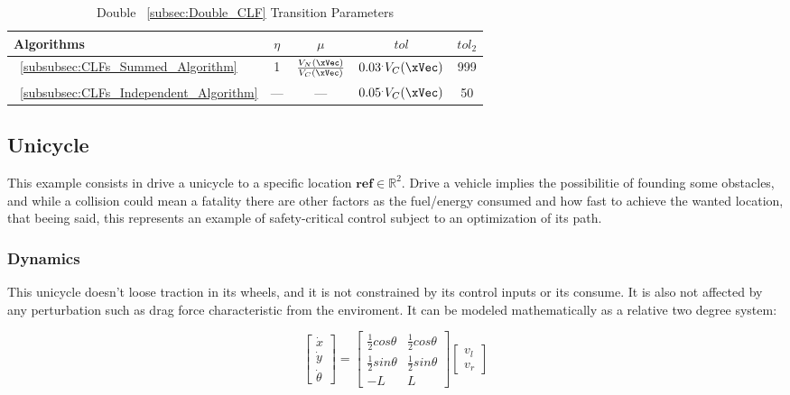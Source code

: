   \bgroup
 \begin{xltabular}{\textwidth}{lcccc}
   \caption{Double ~\ref{subsec:Double_CLF} Transition Parameters}
   \label{tab:Double-CLF:NCDV_parameters}\\
   \toprule
   Algorithms   & $\eta$  & $\mu$  & $tol$   & $tol_2$            \\
   \midrule
    ~\ref{subsubsec:CLFs_Summed_Algorithm} & 1       & $\frac{V_N(\xVec)}{V_C(\xVec)}$          & $0.03^.V_C(\xVec)$          & 999          \\
    ~\ref{subsubsec:CLFs_Independent_Algorithm}   & ---       & ---         & $0.05^.V_C(\xVec)$           & 50        \\
    \midrule
   \end{xltabular}
 \egroup



\subsection{Unicycle}
\label{subsec:unicycle_simul_setup}

This example consists in drive a unicycle to a specific location \(\mathbf{ref} \in \mathbb{R}^2\). Drive a vehicle implies the possibilitie of founding some obstacles, and while a collision could mean a fatality there are other factors as the fuel/energy consumed and how fast to achieve the wanted location, that beeing said, this represents an example of safety-critical control subject to an optimization of its path. \par

\subsubsection{Dynamics}
\label{subsec:unicycle_dynamics}

This unicycle doesn't loose traction in its wheels, and it is not constrained by its control inputs or its consume. It is also not affected by any perturbation such as drag force characteristic from the enviroment. It can be modeled mathematically as a relative two degree system:

\begin{equation}
    \begin{bmatrix} \dot{x} \\ \dot{y} \\ \dot{\theta} \end{bmatrix} = \begin{bmatrix} \frac{1}{2}cos \theta & \frac{1}{2}cos \theta \\  \frac{1}{2}sin \theta & \frac{1}{2}sin \theta \\ -L & L  \end{bmatrix} \begin{bmatrix} v_l \\ v_r\end{bmatrix}
    \label{eq:unicycle_model}
\end{equation}


